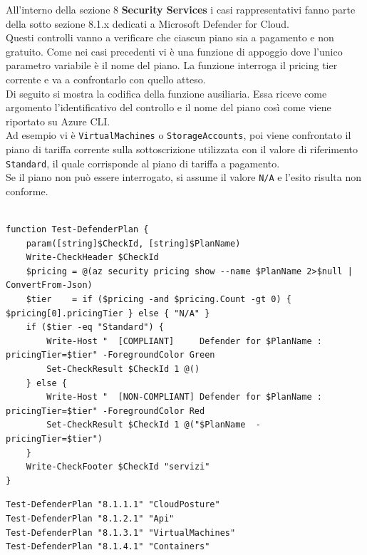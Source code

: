 \documentclass[a4paper,11pt]{report}
\begin{document}
All'interno della sezione 8 \textbf{Security Services} i casi rappresentativi fanno parte della sotto sezione 8.1.x dedicati a Microsoft Defender for Cloud. \\
Questi controlli vanno a verificare che ciascun piano sia a pagamento e non gratuito. Come nei casi precedenti vi è una funzione di appoggio dove l'unico parametro variabile è il nome del piano. La funzione interroga il pricing tier corrente e va a confrontarlo con quello atteso. \\

Di seguito si mostra la codifica della funzione ausiliaria. Essa riceve come argomento l'identificativo del controllo e il nome del piano così come viene riportato su Azure CLI.\\
Ad esempio vi è \texttt{VirtualMachines} o \texttt{StorageAccounts}, poi viene confrontato il piano di tariffa corrente sulla sottoscrizione utilizzata con il valore di riferimento \texttt{Standard}, il quale corrisponde al piano di tariffa a pagamento.\\
Se il piano non può essere interrogato, si assume il valore \texttt{N/A} e l'esito risulta non conforme.

\begin{lstlisting}[style=azcli, caption={Funzione \texttt{Test-DefenderPlan}}, label={lst:defender-plan}]

function Test-DefenderPlan {
    param([string]$CheckId, [string]$PlanName)
    Write-CheckHeader $CheckId
    $pricing = @(az security pricing show --name $PlanName 2>$null | ConvertFrom-Json)
    $tier    = if ($pricing -and $pricing.Count -gt 0) { $pricing[0].pricingTier } else { "N/A" }
    if ($tier -eq "Standard") {
        Write-Host "  [COMPLIANT]     Defender for $PlanName : pricingTier=$tier" -ForegroundColor Green
        Set-CheckResult $CheckId 1 @()
    } else {
        Write-Host "  [NON-COMPLIANT] Defender for $PlanName : pricingTier=$tier" -ForegroundColor Red
        Set-CheckResult $CheckId 1 @("$PlanName  -  pricingTier=$tier")
    }
    Write-CheckFooter $CheckId "servizi"
}
\end{lstlisting}

\begin{lstlisting}[style=azcli, caption={Alcuni esempi di invocazioni di \texttt{Test-DefenderPlan} nel modulo della sezione 8}, label={lst:defender-inv}]
Test-DefenderPlan "8.1.1.1" "CloudPosture"
Test-DefenderPlan "8.1.2.1" "Api"
Test-DefenderPlan "8.1.3.1" "VirtualMachines"
Test-DefenderPlan "8.1.4.1" "Containers"
\end{lstlisting}
\end{document}
